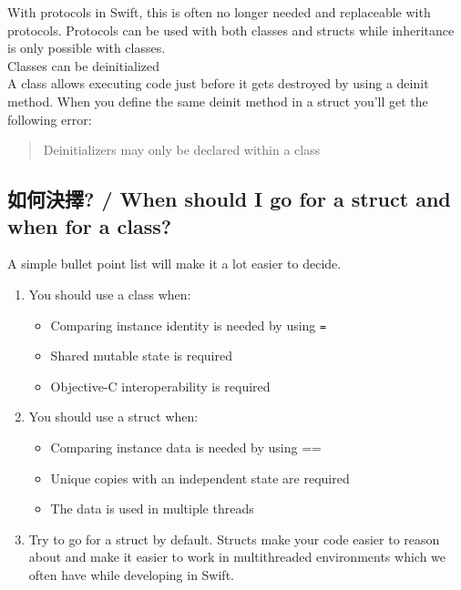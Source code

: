\documentclass[a4paper,12pt]{article}
\begin{document}
\begin{enumerate}
\begin{enumerate}
With protocols in Swift, this is often no longer needed and replaceable with protocols. Protocols can be used with both classes and structs while inheritance is only possible with classes.\\
Classes can be deinitialized\\

A class allows executing code just before it gets destroyed by using a deinit method. When you define the same deinit method in a struct you’ll get the following error:\\
\begin{verse}
Deinitializers may only be declared within a class\\
\end{verse}
\end{enumerate}
\end{enumerate}
\subsection{如何決擇? / When should I go for a struct and when for a class?}
\label{sec:org8112fca}
A simple bullet point list will make it a lot easier to decide.\\
\begin{enumerate}
\item You should use a class when:
\label{sec:org7310f90}
\begin{itemize}
\item Comparing instance identity is needed by using \texttt{=}\\
\item Shared mutable state is required\\
\item Objective-C interoperability is required\\
\end{itemize}
\item You should use a struct when:
\label{sec:orgd3b118b}
\begin{itemize}
\item Comparing instance data is needed by using ==\\
\item Unique copies with an independent state are required\\
\item The data is used in multiple threads\\
\end{itemize}
\item Try to go for a struct by default.
\label{sec:orgf91cf98}
Structs make your code easier to reason about and make it easier to work in multithreaded environments which we often have while developing in Swift.\\
\end{enumerate}
\end{document}
